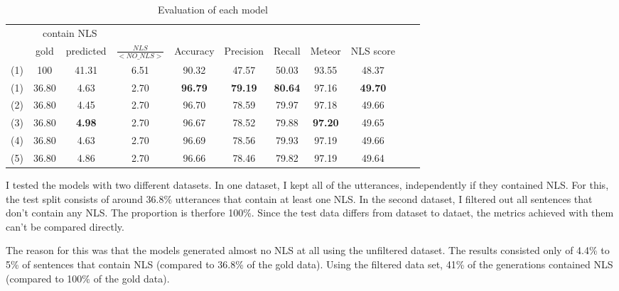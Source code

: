 \documentclass[
	11pt, %
]{fphw}
\begin{document}
\begin{table}[h]
    \centering
    \begin{tabular}{c || c c | c | c c c c c c c}
            & \multicolumn{2}{c|}{contain NLS} &               &                         &                &                &                &                &                & \\
            & gold                             & predicted     & $\frac{NLS}{<NO\_NLS>}$ & Accuracy       & Precision      & Recall         & Meteor         & NLS score        \\
        \hline
        (1) & 100                              & 41.31         & 6.51                    & 90.32          & 47.57          & 50.03          & 93.55          & 48.37            \\
        (1) & 36.80                            & 4.63          & 2.70                    & \textbf{96.79} & \textbf{79.19} & \textbf{80.64} & 97.16          & \textbf{49.70}   \\
        (2) & 36.80                            & 4.45          & 2.70                    & 96.70          & 78.59          & 79.97          & 97.18          & 49.66            \\
        (3) & 36.80                            & \textbf{4.98} & 2.70                    & 96.67          & 78.52          & 79.88          & \textbf{97.20} & 49.65            \\
        (4) & 36.80                            & 4.63          & 2.70                    & 96.69          & 78.56          & 79.93          & 97.19          & 49.66            \\
        (5) & 36.80                            & 4.86          & 2.70                    & 96.66          & 78.46          & 79.82          & 97.19          & 49.64
    \end{tabular}
    \caption{Evaluation of each model}
\end{table}

I tested the models with two different datasets. In one dataset, I kept all of the utterances, independently if they contained NLS. For this, the test split consists of around 36.8\% utterances that contain at least one NLS. In the second dataset, I filtered out all sentences that don't contain any NLS. The proportion is therfore 100\%.
Since the test data differs from dataset to dataet, the metrics achieved with them can't be compared directly.

The reason for this was that the models generated almost no NLS at all using the unfiltered dataset. The results consisted only of 4.4\% to 5\% of sentences that contain NLS (compared to 36.8\% of the gold data). Using the filtered data set, 41\% of the generations contained NLS (compared to 100\% of the gold data).
\end{document}
